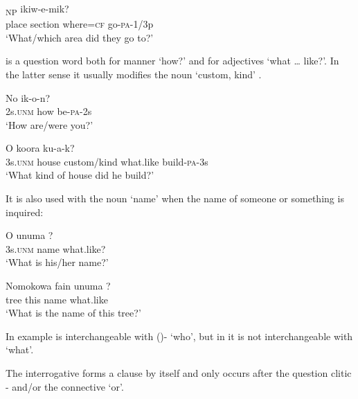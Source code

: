 \ea%
\label{ex:3:x1853}
\gll [Epa ara \textstyleEmphasizedVernacularWords{kaan=eke}]\textsubscript{NP} ikiw-e-mik? \\
place section where=\textsc{cf} go-\textsc{pa}-1/3p\\
\glt`What/which area did they go to?'
\z

 is a question word both for manner `how?'  and for adjectives `what {\dots} like?'. In the latter sense it usually modifies the noun  `custom, kind' .

\ea%
\label{ex:3:x527}
\gll No  ik-o-n? \\
2s.\textsc{unm} how be-\textsc{pa}-2s\\
\glt`How are/were you?'
\z

\ea%
\label{ex:3:x528}
\gll O koora   ku-a-k? \\
3s.\textsc{unm} house custom/kind what.like build-\textsc{pa}-3s\\
\glt`What kind of house did he build?'
\z

It is also used with the noun  `name' when the name of someone or something is inquired:

\ea%
\label{ex:3:x650}
\gll O unuma ? \\
3s.\textsc{unm} name what.like?\\
\glt`What is his/her name?'
\z

\ea%
\label{ex:3:x651}
\gll Nomokowa fain unuma ? \\
tree this name what.like\\
\glt`What is the name of this tree?'
\z

In example   is interchangeable with ()- `who', but in  it is not interchangeable with  `what'.

The interrogative  forms a clause by itself and only occurs after the question clitic - and/or the connective  `or'. 

